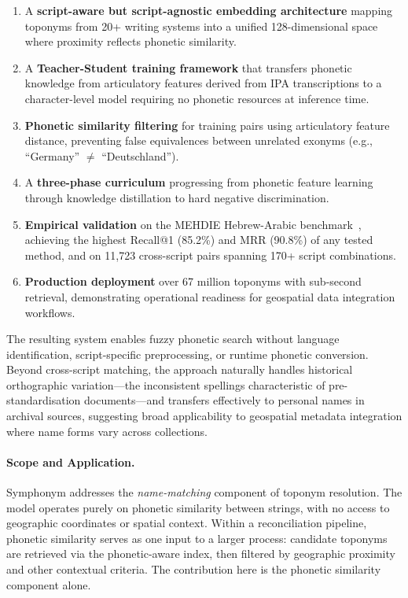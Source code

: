 \documentclass[11pt,a4paper]{article}
\newcommand{\embdim}{128}
\begin{document}
\begin{enumerate}
    \item A \textbf{script-aware but script-agnostic embedding architecture} mapping toponyms from 20+ writing systems into a unified \embdim-dimensional space where proximity reflects phonetic similarity.

    \item A \textbf{Teacher-Student training framework} that transfers phonetic knowledge from articulatory features derived from IPA transcriptions to a character-level model requiring no phonetic resources at inference time.

    \item \textbf{Phonetic similarity filtering} for training pairs using articulatory feature distance, preventing false equivalences between unrelated exonyms (e.g., ``Germany'' $\neq$ ``Deutschland'').

    \item A \textbf{three-phase curriculum} progressing from phonetic feature learning through knowledge distillation to hard negative discrimination.

    \item \textbf{Empirical validation} on the MEHDIE Hebrew-Arabic benchmark~\citep{mehdie2025}, achieving the highest Recall@1 (85.2\%) and MRR (90.8\%) of any tested method, and on 11,723 cross-script pairs spanning 170+ script combinations.

    \item \textbf{Production deployment} over 67 million toponyms with sub-second retrieval, demonstrating operational readiness for geospatial data integration workflows.
\end{enumerate}

The resulting system enables fuzzy phonetic search without language identification, script-specific preprocessing, or runtime phonetic conversion. Beyond cross-script matching, the approach naturally handles historical orthographic variation---the inconsistent spellings characteristic of pre-standardisation documents---and transfers effectively to personal names in archival sources, suggesting broad applicability to geospatial metadata integration where name forms vary across collections.

\paragraph{Scope and Application.} Symphonym addresses the \emph{name-matching} component of toponym resolution. The model operates purely on phonetic similarity between strings, with no access to geographic coordinates or spatial context. Within a reconciliation pipeline, phonetic similarity serves as one input to a larger process: candidate toponyms are retrieved via the phonetic-aware index, then filtered by geographic proximity and other contextual criteria. The contribution here is the phonetic similarity component alone.
\end{document}
